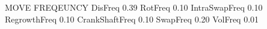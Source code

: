 \documentclass[letterpaper,10pt,english]{sphinxmanual}
\begin{document}
\begin{sphinxVerbatim}[commandchars=\\\{\}]
\PYGZsh{}\PYGZsh{}\PYGZsh{}\PYGZsh{}\PYGZsh{}\PYGZsh{}\PYGZsh{}\PYGZsh{}\PYGZsh{}\PYGZsh{}\PYGZsh{}\PYGZsh{}\PYGZsh{}\PYGZsh{}\PYGZsh{}\PYGZsh{}\PYGZsh{}\PYGZsh{}\PYGZsh{}\PYGZsh{}\PYGZsh{}\PYGZsh{}\PYGZsh{}\PYGZsh{}\PYGZsh{}\PYGZsh{}\PYGZsh{}\PYGZsh{}\PYGZsh{}\PYGZsh{}\PYGZsh{}\PYGZsh{}\PYGZsh{}
\PYGZsh{} MOVE FREQEUNCY
\PYGZsh{}\PYGZsh{}\PYGZsh{}\PYGZsh{}\PYGZsh{}\PYGZsh{}\PYGZsh{}\PYGZsh{}\PYGZsh{}\PYGZsh{}\PYGZsh{}\PYGZsh{}\PYGZsh{}\PYGZsh{}\PYGZsh{}\PYGZsh{}\PYGZsh{}\PYGZsh{}\PYGZsh{}\PYGZsh{}\PYGZsh{}\PYGZsh{}\PYGZsh{}\PYGZsh{}\PYGZsh{}\PYGZsh{}\PYGZsh{}\PYGZsh{}\PYGZsh{}\PYGZsh{}\PYGZsh{}\PYGZsh{}\PYGZsh{}
DisFreq         0.39
RotFreq         0.10
IntraSwapFreq   0.10
RegrowthFreq    0.10
CrankShaftFreq  0.10
SwapFreq        0.20
VolFreq         0.01
\end{sphinxVerbatim}
\end{document}
